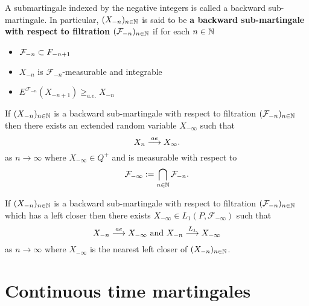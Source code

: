 \begin{definition}
A submartingale indexed by the negative integers is called a backward sub-martingale. In particular, $(X_{-n})_{n\in\Bbb N}$ is said to be {\bf a backward sub-martingale with respect to filtration $(\mathcal F_{-n})_{n\in \Bbb N}$} if for each $n\in \Bbb N$
\begin{itemize}
 \item  $\mathcal F_{-n}\subset \mathcal \mathcal F_{-n+1}$
 \item $X_{-n}$ is $\mathcal F_{-n}$-measurable and integrable
 \item $E^{\mathcal F_{-n}} (X_{-n+1})\geq_{a.e.} X_{-n}$
 \end{itemize}
\end{definition}



\begin{theorem}
If $(X_{-n})_{n\in\Bbb N}$ is a backward sub-martingale with respect to filtration $(\mathcal F_{-n})_{n\in \Bbb N}$  then there exists an extended random variable $X_{-\infty}$ such that
\[
X_n\overset{\small ae} \longrightarrow X_\infty.
\]
as $n\rightarrow \infty$ where $X_{-\infty}\in Q^+$ and is measurable with respect to
\[
\mathcal F_{-\infty}:=\bigcap_{n\in \Bbb N} \mathcal F_{-n}.
\]
\end{theorem}

\begin{theorem}
If $(X_{-n})_{n\in\Bbb N}$ is a backward sub-martingale with respect to filtration $(\mathcal F_{-n})_{n\in \Bbb N}$ which has a left closer then there exists $X_{-\infty}\in L_1(P, \mathcal F_{-\infty})$ such that
\[
X_{-n}\overset{\small ae} \longrightarrow X_{-\infty} \text{ and } X_{-n}\overset{\small L_1} \longrightarrow X_{-\infty}
\]
as $n\rightarrow \infty$ where $X_{-\infty}$ is the nearest left closer of $(X_{-n})_{n\in \Bbb N}$.
\end{theorem}


%
%
\section{Continuous time martingales}

